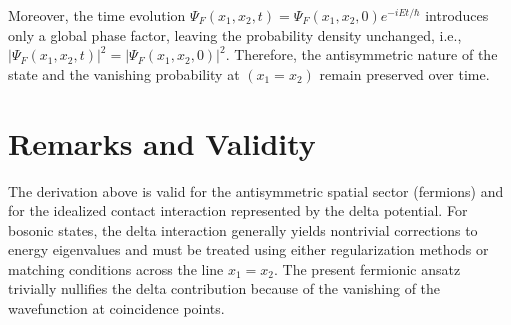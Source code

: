 Moreover, the time evolution $\Psi_F(x_1,x_2,t) = \Psi_F(x_1,x_2,0)e^{-iEt/\hbar}$ introduces only a global phase factor, leaving the probability density unchanged, i.e., $|\Psi_F(x_1,x_2,t)|^2 = |\Psi_F(x_1,x_2,0)|^2$. Therefore, the antisymmetric nature of the state and the vanishing probability at $(x_1 = x_2)$ remain preserved over time.






\section{Remarks and Validity}

The derivation above is valid for the antisymmetric spatial sector (fermions) and for the idealized contact interaction represented by the delta potential. For bosonic states, the delta interaction generally yields nontrivial corrections to energy eigenvalues and must be treated using either regularization methods or matching conditions across the line $x_1=x_2$. The present fermionic ansatz trivially nullifies the delta contribution because of the vanishing of the wavefunction at coincidence points.

